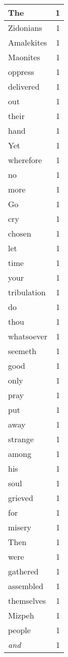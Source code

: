 \begin{center}
\begin{longtable}{l|r}
The & 1\\ \hline 
Zidonians & 1\\ \hline 
Amalekites & 1\\ \hline 
Maonites & 1\\ \hline 
oppress & 1\\ \hline 
delivered & 1\\ \hline 
out & 1\\ \hline 
their & 1\\ \hline 
hand & 1\\ \hline 
Yet & 1\\ \hline 
wherefore & 1\\ \hline 
no & 1\\ \hline 
more & 1\\ \hline 
Go & 1\\ \hline 
cry & 1\\ \hline 
chosen & 1\\ \hline 
let & 1\\ \hline 
time & 1\\ \hline 
your & 1\\ \hline 
tribulation & 1\\ \hline 
do & 1\\ \hline 
thou & 1\\ \hline 
whatsoever & 1\\ \hline 
seemeth & 1\\ \hline 
good & 1\\ \hline 
only & 1\\ \hline 
pray & 1\\ \hline 
put & 1\\ \hline 
away & 1\\ \hline 
strange & 1\\ \hline 
among & 1\\ \hline 
his & 1\\ \hline 
soul & 1\\ \hline 
grieved & 1\\ \hline 
for & 1\\ \hline 
misery & 1\\ \hline 
Then & 1\\ \hline 
were & 1\\ \hline 
gathered & 1\\ \hline 
assembled & 1\\ \hline 
themselves & 1\\ \hline 
Mizpeh & 1\\ \hline 
people & 1\\ \hline 
\emph{and} & 1\\ \hline 

\end{longtable}
\end{center}
